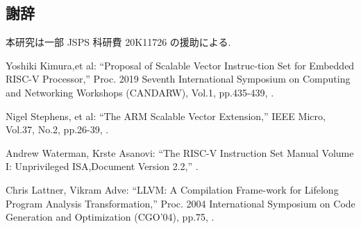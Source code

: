 \documentclass[a4paper,9pt, twocolumn]{jarticle}
\renewcommand{\baselinestretch}{0.87}   %
\begin{document}
\renewcommand{\baselinestretch}{0.83}\selectfont
\subsection*{\small 謝辞}
\vspace{-0.5mm}
{\small 本研究は一部 JSPS 科研費 20K11726 の援助による.}


%
%
\begin{thebibliography}{9}
\itemsep -1.7pt

{\small Yoshiki Kimura,et al:      %
\newblock ``Proposal of Scalable Vector Instruc-tion Set for Embedded RISC-V Processor,''
\newblock Proc. 2019 Seventh International Symposium on Computing and Networking Workshops (CANDARW),
\newblock Vol.1,
\newblock pp.435-439,
.}

{\small Nigel Stephens, et al:      %
\newblock ``The ARM Scalable Vector Extension,''
\newblock IEEE Micro,
\newblock Vol.37,
\newblock No.2,
\newblock pp.26-39,
.}

{\small Andrew Waterman, Krste Asanovi:      %
\newblock ``The RISC-V Instruction Set Manual Volume I: Unprivileged ISA,Document Version 2.2,''
.}

{\small Chris Lattner, Vikram Adve:      %
\newblock ``LLVM: A Compilation Frame-work for Lifelong Program Analysis Transformation,''
\newblock Proc. 2004 International Symposium on Code Generation and Optimization (CGO’04),
\newblock pp.75,
.}

\end{thebibliography}
\end{document}
